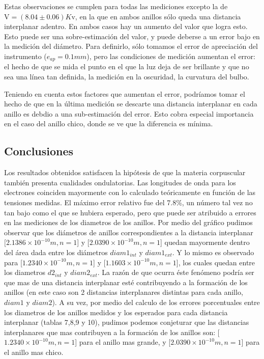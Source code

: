 \documentclass[]{article}
\begin{document}
Estas observaciones se cumplen para todas las mediciones excepto la de
\(\mathrm{V} = (8.04 \pm 0.06)K\mathrm{v}\), en la que en ambos anillos
sólo queda una distancia interplanar adentro. En ambos casos hay un
aumento del valor que logra esto. Esto puede ser una sobre-estimación
del valor, y puede deberse a un error bajo en la medición del diámetro.
Para definirlo, sólo tomamos el error de apreciación del instrumento
(\(e_{ap} = 0.1mm\)), pero las condiciones de medición aumentan el
error: el hecho de que se mida el punto en el que la luz deja de ser
brillante y que no sea una línea tan definida, la medición en la
oscuridad, la curvatura del bulbo.

Teniendo en cuenta estos factores que aumentan el error, podríamos tomar
el hecho de que en la última medición se descarte una distancia
interplanar en cada anillo es debdio a una sub-estimación del error.
Esto cobra especial importancia en el caso del anillo chico, donde se ve
que la diferencia es mínima.



\hypertarget{conclusiones}{%
\subsection{Conclusiones}\label{conclusiones}}

Los resultados obtenidos satisfacen la hipótesis de que la materia
corpuscular también presenta cualidades ondulatorias. Las longitudes de
onda para los electrones coinciden mayormente con lo calculado teóricamente en
función de las tensiones medidas. El máximo error relativo fue del
7.8\%, un número tal vez no tan bajo como el que se hubiera esperado, pero 
que puede ser atribuido a errores en las mediciones de los diametros de los
anillos. Por medio del gráfico pudimos observar que los diámetros de anillos correspondientes a la distancia interplanar $[2.1386 \times 10^{-10} m, n=1$] y [$2.0390 \times10^{-10} m, n=1$] quedan mayormente dentro del área dada 
entre los diámetros $diam1_{int}$ y $diam1_{ext}$. Y lo mismo es observado para [$1.2340 \times10^{-10} m, n=1$] y [$1.1603 \times10^{-10} m, n=1$], los 
cuales quedan entre los diametros $d2_{int}$ y $diam2_{ext}$. 
La razón de que ocurra éste fenómeno podría ser que mas de una distancia 
interplanar esté contribuyendo a la formación de los anillos (en este caso 
son 2 distancias interplanares distintas para cada anillo, $diam1$ y $diam2$).
A su vez, por medio del calculo de los errores porcentuales entre los diametros
de los anillos medidos y los esperados para cada distancia interplanar (tablas 
7,8,9 y 10), pudimos podemos conjeturar que las distancias interplanares que 
mas contribuyen a la formación de los anillos son: [$1.2340 \times10^{-10} m, n=1$] 
para el anillo mas grande, y [$2.0390 \times10^{-10} m, n=1$] para el anillo 
mas chico.
\end{document}
